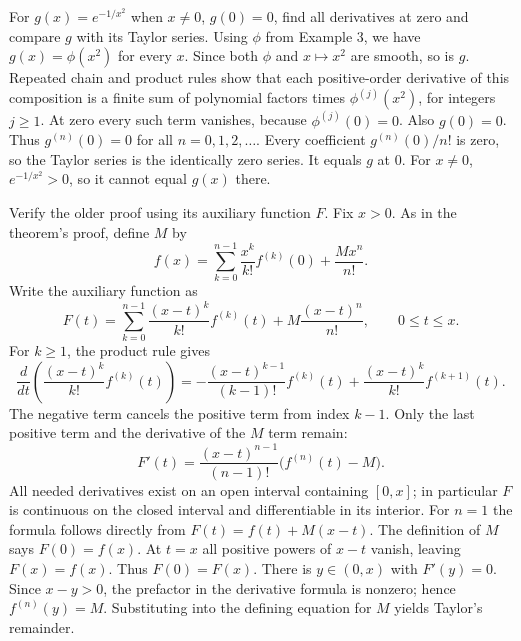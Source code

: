 \goal For $g(x)=e^{-1/x^2}$ when $x\ne0$, $g(0)=0$, find all derivatives
at zero and compare $g$ with its Taylor series.
Using $\phi$ from Example 3, we have $g(x)=\phi(x^2)$ for every $x$.
Since both $\phi$ and $x\mapsto x^2$ are smooth, so is $g$.
Repeated chain and product rules show that each positive-order derivative
of this composition is a finite sum of polynomial factors times
$\phi^{(j)}(x^2)$, for integers $j\ge1$. At zero every such term vanishes,
because $\phi^{(j)}(0)=0$. Also $g(0)=0$. Thus
$g^{(n)}(0)=0$ for all $n=0,1,2,\ldots$.
Every coefficient $g^{(n)}(0)/n!$ is zero, so the Taylor series is the
identically zero series. It equals $g$ at $0$. For $x\ne0$,
$e^{-1/x^2}>0$, so it cannot equal $g(x)$ there.

\goal Verify the older proof using its auxiliary function $F$.
Fix $x>0$. As in the theorem's proof, define $M$ by
\[
 f(x)=\sum_{k=0}^{n-1}\frac{x^k}{k!}f^{(k)}(0)+\frac{Mx^n}{n!}.
\]
Write the auxiliary function as
\[
 F(t)=\sum_{k=0}^{n-1}\frac{(x-t)^k}{k!}f^{(k)}(t)
       +M\frac{(x-t)^n}{n!},\qquad0\le t\le x.
\]
For $k\ge1$, the product rule gives
\[
 \frac{d}{dt}\left(\frac{(x-t)^k}{k!}f^{(k)}(t)\right)
 =-\frac{(x-t)^{k-1}}{(k-1)!}f^{(k)}(t)
   +\frac{(x-t)^k}{k!}f^{(k+1)}(t).
\]
The negative term cancels the positive term from index $k-1$.
Only the last positive term and the derivative of the $M$ term remain:
\[
 F'(t)=\frac{(x-t)^{n-1}}{(n-1)!}\bigl(f^{(n)}(t)-M\bigr).
\]
All needed derivatives exist on an open interval containing $[0,x]$;
in particular $F$ is continuous on the closed interval and differentiable
in its interior. For $n=1$ the formula follows directly from
$F(t)=f(t)+M(x-t)$.
The definition of $M$ says $F(0)=f(x)$. At $t=x$ all positive powers
of $x-t$ vanish, leaving $F(x)=f(x)$. Thus $F(0)=F(x)$.
There is $y\in(0,x)$ with $F'(y)=0$. Since $x-y>0$, the prefactor
in the derivative formula is nonzero; hence $f^{(n)}(y)=M$.
Substituting into the defining equation for $M$ yields Taylor's remainder.

